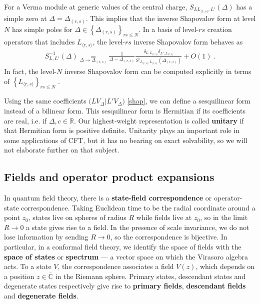\documentclass[12pt, a4paper]{article}
\newcommand{\myindex}[1]{\textbf{\boldmath #1}}
\begin{document}
For a Verma module at generic values of the central charge, $S_{LL_{\langle r,s\rangle},L'}(\Delta)$ has a simple zero at $\Delta=\Delta_{(r,s)}$. This implies that the inverse Shapovalov form at level $N$ has simple poles for $\Delta\in \left\{\Delta_{(r,s)}\right\}_{rs\leq N}$. In a basis of level-$rs$ creation operators that includes $L_{\langle r,s\rangle}$, the level-$rs$ inverse Shapovalov form behaves as
\begin{align}
 S^{-1}_{L,L'}(\Delta) \underset{\Delta\to \Delta_{(r,s)}} = \frac{1}{\Delta-\Delta_{(r,s)}} \frac{\delta_{L,L_{\langle r,s\rangle}}\delta_{L',L_{\langle r,s\rangle}}}{S'_{L_{\langle r,s\rangle},L_{\langle r,s\rangle}}(\Delta_{(r,s)})}  + O(1) \ . 
 \label{smo}
\end{align}
In fact, the level-$N$ inverse Shapovalov form can be computed explicitly in terms of $\left\{L_{\langle r,s\rangle}\right\}_{rs\leq N}$ \cite{fqs24}.

Using the same coefficients $\big(LV_\Delta\big| L'V_\Delta\big)$ \eqref{shap}, we can define a sesquilinear form instead of a bilinear form. This sesquilinear form is Hermitian if its coefficients are real, i.e. if $\Delta,c\in\mathbb{R}$. Our highest-weight representation is called \myindex{unitary} if that Hermitian form is positive definite. Unitarity plays an important role in some applications of CFT, but it has no bearing on exact solvability, so we will not elaborate further on that subject.


\subsection{Fields and operator product expansions}\label{sec:fope}

In quantum field theory, there is a \myindex{state-field correspondence} or operator-state correspondence. Taking Euclidean time to be the radial coordinate around a point $z_0$, states live on spheres of radius $R$ while fields live at $z_0$, so in the limit $R\to 0$ a state gives rise to a field.
In the presence of scale invariance, we do not lose information by sending $R\to 0$, so the correspondence is bijective. In particular, in a conformal field theory, we identify the space of fields with the \myindex{space of states}  or \myindex{spectrum}  --- a vector space on which the Virasoro algebra acts. To a state $V$, the correspondence associates a field $V(z)$, which depends on a position $z\in\overline{\mathbb{C}}$ in the Riemann sphere. Primary states, descendant states and degenerate states respectively give rise to \myindex{primary fields}, \myindex{descendant fields} and \myindex{degenerate fields}.
\end{document}

